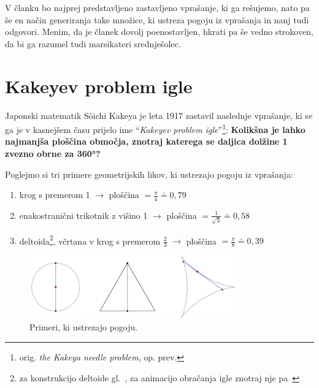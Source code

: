\documentclass[a4paper, 12pt]{article}
\begin{document}
V članku bo najprej predstavljeno zastavljeno vprašanje, ki ga rešujemo, nato pa še en način generiranja take množice, ki ustreza pogoju iz vprašanja in nanj tudi odgovori. Menim, da je članek dovolj poenostavljen, hkrati pa še vedno strokoven, da bi ga razumel tudi marsikateri srednješolec.

\newpage


\section*{Kakeyev problem igle}

Japonski matematik Sōichi Kakeya je leta 1917 zastavil naslednje vprašanje, ki se ga je v kasnejšem času prijelo ime ``\emph{Kakeyev problem igle}''\footnote{orig. \emph{the Kakeya needle problem}, op. prev.}: \textbf{Kolikšna je lahko najmanjša ploščina območja, znotraj katerega se daljica dolžine 1 zvezno obrne za 360°?}

\noindent Poglejmo si tri primere geometrijskih likov, ki ustrezajo pogoju iz vprašanja:

\begin{enumerate}
    \item krog s premerom 1 $ \rightarrow $ ploščina $ = \frac{\pi}{4} \doteq 0{,}79 $
    \item enakostranični trikotnik z višino 1 $ \rightarrow $ ploščina $ = \frac{1}{\sqrt{3}} \doteq 0{,}58 $
    \item deltoida\footnote{za konstrukcijo deltoide gl.~\cite{deltoida}, za animacijo obračanja igle znotraj nje pa~\cite{kakeya_wiki}}, včrtana v krog s premerom $ \frac{2}{3} $ $ \rightarrow $ ploščina $ = \frac{\pi}{8} \doteq 0{,}39 $
\end{enumerate}

\begin{figure}[h!]
    \centering
    \includegraphics[width=0.8\textwidth]{geogebra_slike/prevelike_ploscine.png}
    \caption{Primeri, ki ustrezajo pogoju.}
    \label{primeri}
\end{figure}
\end{document}
